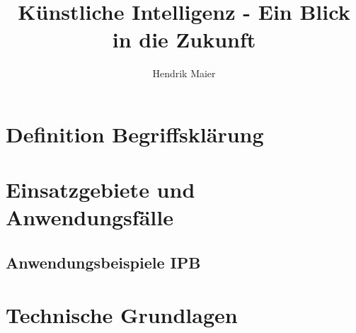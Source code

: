 \documentclass[12pt]{report}
\title{Künstliche Intelligenz - Ein Blick in die Zukunft}
\author{Hendrik Maier}
\date{}
\begin{document}
    \maketitle

    \section{Definition Begriffsklärung}
    \section{Einsatzgebiete und Anwendungsfälle}
    \subsection{Anwendungsbeispiele IPB}
    \section{Technische Grundlagen}
    \subsection{}
\end{document}
